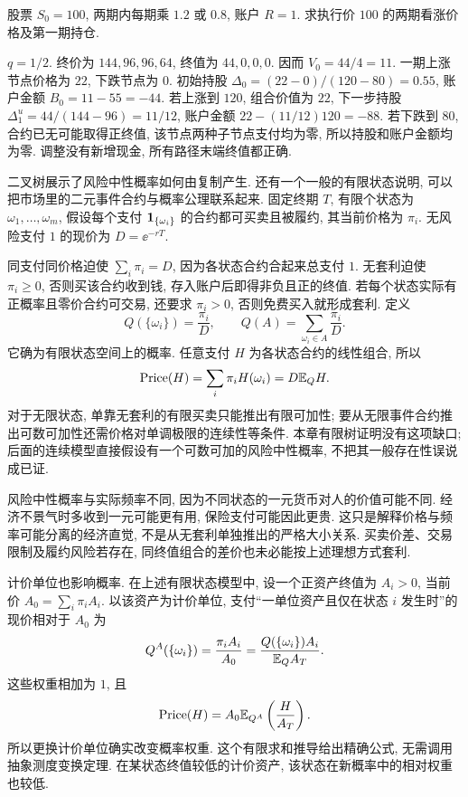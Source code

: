 \begin{example}
股票 $S_0=100$, 两期内每期乘 $1.2$ 或 $0.8$, 账户 $R=1$. 求执行价 $100$ 的两期看涨价格及第一期持仓.
\end{example}
\begin{solution}
$q=1/2$. 终价为 $144,96,96,64$, 终值为 $44,0,0,0$. 因而 $V_0=44/4=11$. 一期上涨节点价格为 $22$, 下跌节点为 $0$. 初始持股
$\Delta_0=(22-0)/(120-80)=0.55$, 账户金额 $B_0=11-55=-44$.
若上涨到 $120$, 组合价值为 $22$, 下一步持股
$\Delta_1^u=44/(144-96)=11/12$, 账户金额 $22-(11/12)120=-88$.
若下跌到 $80$, 合约已无可能取得正终值, 该节点两种子节点支付均为零, 所以持股和账户金额均为零. 调整没有新增现金, 所有路径末端终值都正确.
\end{solution}

二叉树展示了风险中性概率如何由复制产生. 还有一个一般的有限状态说明, 可以把市场里的二元事件合约与概率公理联系起来. 固定终期 $T$, 有限个状态为 $\omega_1,\ldots,\omega_m$, 假设每个支付 $\mathbf 1_{\{\omega_i\}}$ 的合约都可买卖且被履约, 其当前价格为 $\pi_i$. 无风险支付 $1$ 的现价为 $D=\ee^{-rT}$.

同支付同价格迫使 $\sum_i\pi_i=D$, 因为各状态合约合起来总支付 $1$. 无套利迫使 $\pi_i\geq0$, 否则买该合约收到钱, 存入账户后即得非负且正的终值. 若每个状态实际有正概率且零价合约可交易, 还要求 $\pi_i>0$, 否则免费买入就形成套利. 定义
\[
 Q(\{\omega_i\})=\frac{\pi_i}{D},\qquad
 Q(A)=\sum_{\omega_i\in A}\frac{\pi_i}{D}.
\]
它确为有限状态空间上的概率. 任意支付 $H$ 为各状态合约的线性组合, 所以
\[
 \operatorname{Price}(H)=\sum_i\pi_iH(\omega_i)
 =D\mathbb E_QH.
\]
对于无限状态, 单靠无套利的有限买卖只能推出有限可加性; 要从无限事件合约推出可数可加性还需价格对单调极限的连续性等条件. 本章有限树证明没有这项缺口; 后面的连续模型直接假设有一个可数可加的风险中性概率, 不把其一般存在性误说成已证.

风险中性概率与实际频率不同, 因为不同状态的一元货币对人的价值可能不同. 经济不景气时多收到一元可能更有用, 保险支付可能因此更贵. 这只是解释价格与频率可能分离的经济直觉, 不是从无套利单独推出的严格大小关系. 买卖价差、交易限制及履约风险若存在, 同终值组合的差价也未必能按上述理想方式套利.

计价单位也影响概率. 在上述有限状态模型中, 设一个正资产终值为 $A_i>0$, 当前价 $A_0=\sum_i\pi_iA_i$. 以该资产为计价单位, 支付“一单位资产且仅在状态 $i$ 发生时”的现价相对于 $A_0$ 为
\[
 Q^A(\{\omega_i\})=\frac{\pi_iA_i}{A_0}
 =\frac{Q(\{\omega_i\})A_i}{\mathbb E_QA_T}.
\]
这些权重相加为 $1$, 且
\[
 \operatorname{Price}(H)=A_0\mathbb E_{Q^A}\left(\frac{H}{A_T}\right).
\]
所以更换计价单位确实改变概率权重. 这个有限求和推导给出精确公式, 无需调用抽象测度变换定理. 在某状态终值较低的计价资产, 该状态在新概率中的相对权重也较低.

